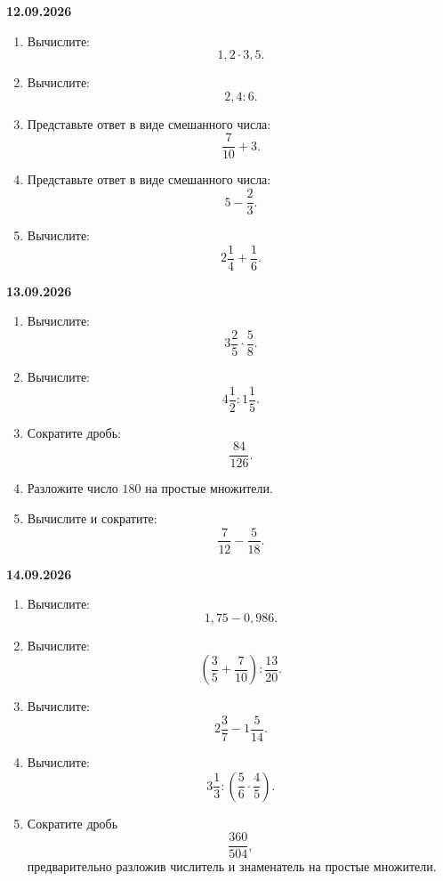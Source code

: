 \documentclass[a4paper,12pt]{article}
\begin{document}
\textbf{12.09.2026}

\begin{enumerate}[resume]

  \item Вычислите:
        \[
        1{,}2\cdot3{,}5.
        \]

  \item Вычислите:
        \[
        2{,}4:6.
        \]

  \item Представьте ответ в виде смешанного числа:
        \[
        \frac7{10}+3.
        \]

  \item Представьте ответ в виде смешанного числа:
        \[
        5-\frac23.
        \]

  \item Вычислите:
        \[
        2\frac14+\frac16.
        \]

\end{enumerate}

\textbf{13.09.2026}

\begin{enumerate}[resume]

  \item Вычислите:
        \[
        3\frac25\cdot\frac58.
        \]

  \item Вычислите:
        \[
        4\frac12:1\frac15.
        \]

  \item Сократите дробь:
        \[
        \frac{84}{126}.
        \]

  \item Разложите число \(180\)
        на простые множители.

  \item Вычислите и сократите:
        \[
        \frac7{12}-\frac5{18}.
        \]

\end{enumerate}

\textbf{14.09.2026}

\begin{enumerate}[resume]

  \item Вычислите:
        \[
        1{,}75-0{,}986.
        \]

  \item Вычислите:
        \[
        \left(
        \frac35+\frac7{10}
        \right)
        :
        \frac{13}{20}.
        \]

  \item Вычислите:
        \[
        2\frac37-1\frac5{14}.
        \]

  \item Вычислите:
        \[
        3\frac13:
        \left(
        \frac56\cdot\frac45
        \right).
        \]

  \item Сократите дробь
        \[
        \frac{360}{504},
        \]
        предварительно разложив числитель и знаменатель
        на простые множители.

\end{enumerate}
\end{document}
